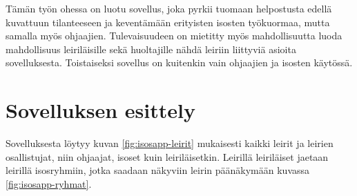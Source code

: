 Tämän työn ohessa on luotu sovellus, joka pyrkii tuomaan helpostusta edellä
kuvattuun tilanteeseen ja keventämään erityisten isosten työkuormaa, mutta
samalla myös ohjaajien. Tulevaisuudeen on mietitty myös mahdollisuutta luoda
mahdollisuus leiriläisille sekä huoltajille nähdä leiriin liittyviä asioita
sovelluksesta. Toistaiseksi sovellus on kuitenkin vain ohjaajien ja isosten
käytössä.

\section{Sovelluksen esittely}

Sovelluksesta löytyy kuvan \ref{fig:isosapp-leirit} mukaisesti kaikki leirit ja
leirien osallistujat, niin ohjaajat, isoset kuin leiriläisetkin. Leirillä
leiriläiset jaetaan leirillä isosryhmiin, jotka saadaan näkyviin leirin
päänäkymään kuvassa \ref{fig:isosapp-ryhmat}.

